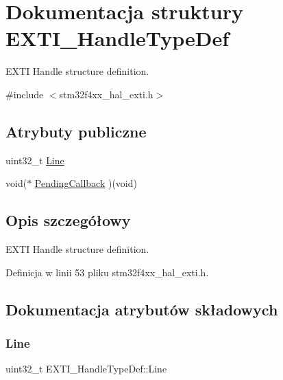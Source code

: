 \hypertarget{struct_e_x_t_i___handle_type_def}{}\section{Dokumentacja struktury E\+X\+T\+I\+\_\+\+Handle\+Type\+Def}
\label{struct_e_x_t_i___handle_type_def}


E\+X\+TI Handle structure definition.  




{\ttfamily \#include $<$stm32f4xx\+\_\+hal\+\_\+exti.\+h$>$}

\subsection*{Atrybuty publiczne}
\begin{DoxyCompactItemize}
\item 
uint32\+\_\+t \hyperlink{struct_e_x_t_i___handle_type_def_a6a2875051ad4276be5322ffa99e12566}{Line}
\item 
void($\ast$ \hyperlink{struct_e_x_t_i___handle_type_def_a854aa31dcf03aab7089851afae6da8d3}{Pending\+Callback} )(void)
\end{DoxyCompactItemize}


\subsection{Opis szczegółowy}
E\+X\+TI Handle structure definition. 

Definicja w linii 53 pliku stm32f4xx\+\_\+hal\+\_\+exti.\+h.



\subsection{Dokumentacja atrybutów składowych}
\mbox{\label{struct_e_x_t_i___handle_type_def_a6a2875051ad4276be5322ffa99e12566}} 
\subsubsection{\texorpdfstring{Line}{Line}}
{\footnotesize\ttfamily uint32\+\_\+t E\+X\+T\+I\+\_\+\+Handle\+Type\+Def\+::\+Line}

